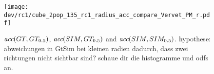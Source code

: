 \begin{figure}[!p]
\centering
\texttt{[image: dev/rc1/cube\_2pop\_135\_rc1\_radius\_acc\_compare\_Vervet\_PM\_r.pdf]}
\caption[sim acc]{ $\textit{acc}{}(GT,GT_{0.5})$, $\textit{acc}{}(SIM,GT_{0.5})$ and $\textit{acc}{}(SIM,SIM_{0.5})$. hypothese: abweichungen in GtSim bei kleinen radien dadurch, dass zwei richtungen nicht sichtbar sind? schaue dir die histogramme und odfs an. }
\label{fig:accVervetPMr}
\end{figure}
% 